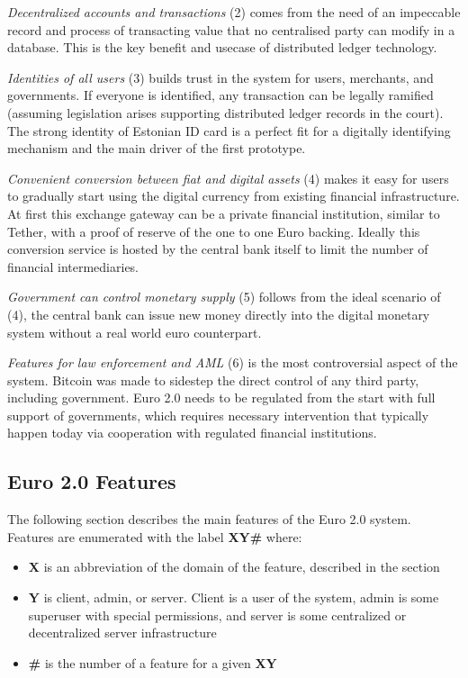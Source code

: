 \documentclass[a4paper,12pt]{article} %
\newcommand{\hypernameref}[1]{\hyperref[#1]{\nameref{#1}}}
\begin{document}
{{\textit{Decentralized accounts and transactions} (2) comes from the need of an impeccable record and process of transacting value that no centralised party can modify in a database. This is the key benefit and usecase of distributed ledger technology.

\textit{Identities of all users} (3) builds trust in the system for users, merchants, and governments. If everyone is identified, any transaction can be legally ramified (assuming legislation arises supporting distributed ledger records in the court). The strong identity of Estonian ID card is a perfect fit for a digitally identifying mechanism and the main driver of the first prototype.

\textit{Convenient conversion between fiat and digital assets} (4) makes it easy for users to gradually start using the digital currency from existing financial infrastructure. At first this exchange gateway can be a private financial institution, similar to Tether\cite{tether}, with a proof of reserve of the one to one Euro backing. Ideally this conversion service is hosted by the central bank itself to limit the number of financial intermediaries.

\textit{Government can control monetary supply} (5) follows from the ideal scenario of (4), the central bank can issue new money directly into the digital monetary system without a real world euro counterpart.

\textit{Features for law enforcement and AML} (6) is the most controversial aspect of the system. Bitcoin was made to sidestep the direct control of any third party, including government\cite{nakamoto2008bitcoin}. Euro 2.0 needs to be regulated from the start with full support of governments, which requires necessary intervention that typically happen today via cooperation with regulated financial institutions.

\subsection{Euro 2.0 Features} \label{ssec:3.3}

The following section describes the main features of the Euro 2.0 system. Features are enumerated with the label \textbf{XY\#} where:
\begin{itemize}
	\item \textbf{X} is an abbreviation of the domain of the feature, described in the \hypernameref{sssec:3.3:domains} section
	\item \textbf{Y} is client, admin, or server. Client is a user of the system, admin is some superuser with special permissions, and server is some centralized or decentralized server infrastructure
	\item \textbf{\#} is the number of a feature for a given \textbf{XY}
\end{itemize}

}}
\end{document}
